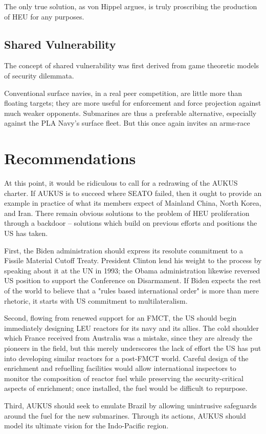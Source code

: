 \documentclass[letterpaper,12pt,twoside]{article} %
\begin{document}
\begin{multicols}{2}
The only true solution, as von Hippel\autocite{hippel2016banning} argues, is truly proscribing the production of HEU for any purposes.

\subsection{Shared Vulnerability}

The concept of shared vulnerability was first derived from game theoretic models of security dilemmata.

Conventional surface navies, in a real peer competition, are little more than floating targets; they are more useful for enforcement and force projection against much weaker opponents. Submarines are thus a preferable alternative, especially against the PLA Navy's surface fleet. But this once again invites an arms-race

\vfill
\pagebreak
\section{Recommendations}

At this point, it would be ridiculous to call for a redrawing of the AUKUS charter. If AUKUS is to succeed where SEATO failed, then it ought to provide an example in practice of what its members expect of Mainland China, North Korea, and Iran. There remain obvious solutions to the problem of HEU proliferation through a backdoor -- solutions which build on previous efforts and positions the US has taken.

First, the Biden administration should express its resolute commitment to a Fissile Material Cutoff Treaty. President Clinton lend his weight to the process by speaking about it at the UN in 1993; the Obama administration likewise reversed US position to support the Conference on Disarmament. If Biden expects the rest of the world to believe that a "rules based international order" is more than mere rhetoric, it starts with US commitment to multilateralism.

Second, flowing from renewed support for an FMCT, the US should begin immediately designing LEU reactors for its navy and its allies. The cold shoulder which France received from Australia was a mistake, since they are already the pioneers in the field, but this merely underscores the lack of effort the US has put into developing similar reactors for a post-FMCT world. Careful design of the enrichment and refuelling facilities would allow international inspectors to monitor the composition of reactor fuel while preserving the security-critical aspects of enrichment; once installed, the fuel would be difficult to repurpose.

Third, AUKUS should seek to emulate Brazil by allowing unintrusive safeguards around the fuel for the new submarines. Through its actions, AUKUS should model its ultimate vision for the Indo-Pacific region.

\end{multicols}
  \vfill
  \pagebreak

\nocite{philippe2014safeguarding}
\nocite{costa2017brazil}

\printbibliography[heading=bibintoc,title=Bibliography]


\end{document}

